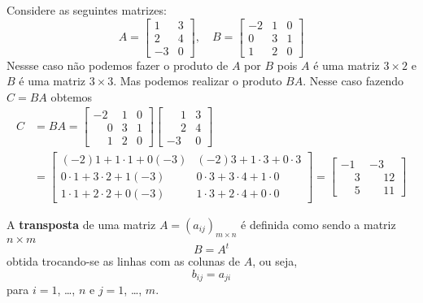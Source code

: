 \documentclass{beamer}
\begin{document}
  \begin{frame}
    \begin{exemplo}
      Considere as seguintes matrizes: 
      \[
        A = \begin{bmatrix}
          1 & 3\\
          2 & 4\\
          -3 & 0
        \end{bmatrix},\quad
        B = \begin{bmatrix}
          -2 & 1 & 0\\
          0 & 3 & 1\\
          1 & 2 & 0
        \end{bmatrix}
      \]
      Nessse caso não podemos fazer o produto de $A$ por $B$ pois $A$ é uma matriz $3 \times 2$ e $B$ é uma matriz $3 \times 3$. 
      Mas podemos realizar o produto $BA$. Nesse caso fazendo $C = BA$ obtemos
      \begin{align*}
        C &= BA = \begin{bmatrix}
          -2 & 1 & 0\\
          \phantom{-}0 & 3 & 1\\
          \phantom{-}1 & 2 & 0
        \end{bmatrix}\begin{bmatrix}
          \phantom{-}1 & 3\\
          \phantom{-}2 & 4\\
          -3 & 0
        \end{bmatrix} \\
        &= \begin{bmatrix}
          (-2)1 + 1\cdot 1 + 0(-3) & (-2)3 + 1\cdot 3 + 0\cdot 3\\
          0\cdot 1 + 3\cdot 2 + 1(-3) & 0\cdot 3 + 3\cdot 4 + 1\cdot 0\\
          1 \cdot 1 + 2 \cdot 2 + 0(-3) & 1 \cdot 3 + 2 \cdot 4 + 0\cdot 0
        \end{bmatrix}
        = \begin{bmatrix}
          -1 & -3\\
          \phantom{-}3 & \phantom{-}12\\
          \phantom{-}5 & \phantom{-}11
        \end{bmatrix}
      \end{align*}
    \end{exemplo}
  \end{frame}

  \begin{frame}
    \begin{definicao}
      A \textbf{transposta} de uma matriz $A = (a_{ij})_{m \times n}$ é definida como sendo a matriz $n \times m$ 
      \[
        B = A^t 
      \]
      obtida trocando-se as linhas com as colunas de $A$, ou seja, 
      \[
        b_{ij} = a_{ji}
      \]
      para $i = 1$, \dots, $n$ e $j = 1$, \dots, $m$.
    \end{definicao}
  \end{frame}
\end{document}
